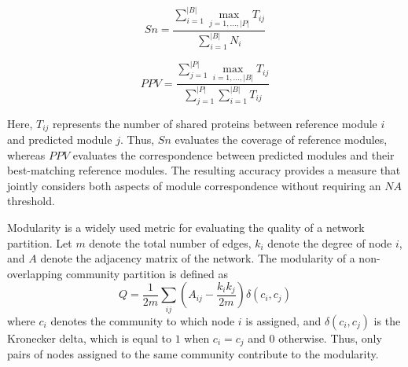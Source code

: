 \begin{equation}
	Sn =
	\frac{
		\sum_{i=1}^{|B|}
		\max_{j=1,\ldots,|P|} T_{ij}
	}{
		\sum_{i=1}^{|B|} N_i
	}
	\label{eq:sn}
\end{equation}

\begin{equation}
	PPV =
	\frac{
		\sum_{j=1}^{|P|}
		\max_{i=1,\ldots,|B|} T_{ij}
	}{
		\sum_{j=1}^{|P|}
		\sum_{i=1}^{|B|} T_{ij}
	}
	\label{eq:ppv}
\end{equation}

Here, $T_{ij}$ represents the number of shared proteins between reference module $i$ and predicted module $j$. Thus, $Sn$ evaluates the coverage of reference modules, whereas $PPV$ evaluates the correspondence between predicted modules and their best-matching reference modules. The resulting accuracy provides a measure that jointly considers both aspects of module correspondence without requiring an $NA$ threshold.

%

Modularity is a widely used metric for evaluating the quality of a network partition. Let $m$ denote the total number of edges, $k_i$ denote the degree of node $i$, and $A$ denote the adjacency matrix of the network. The modularity of a non-overlapping community partition is defined as
\begin{equation}
	\label{eq:modularity-partitioning}
	Q = \frac{1}{2m}\sum_{ij}
	\left(
	A_{ij} - \frac{k_i k_j}{2m}
	\right)
	\delta(c_i,c_j)
\end{equation}
where $c_i$ denotes the community to which node $i$ is assigned, and $\delta(c_i,c_j)$ is the Kronecker delta, which is equal to $1$ when $c_i=c_j$ and $0$ otherwise. Thus, only pairs of nodes assigned to the same community contribute to the modularity.

